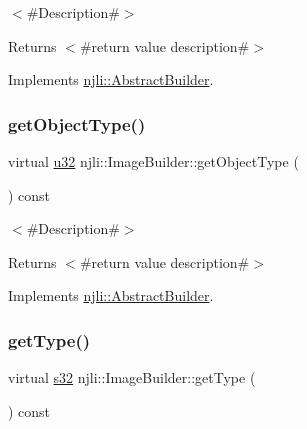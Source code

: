 $<$\#\+Description\#$>$

\begin{DoxyReturn}{Returns}
$<$\#return value description\#$>$ 
\end{DoxyReturn}


Implements \mbox{\hyperlink{classnjli_1_1_abstract_builder_a902f73ea78031b06aca183a417f3413b}{njli\+::\+Abstract\+Builder}}.

\mbox{\label{classnjli_1_1_image_builder_ae1c1fcb0cbeadd3b2436df14113e62d0}} 
\subsubsection{\texorpdfstring{get\+Object\+Type()}{getObjectType()}}
{\footnotesize\ttfamily virtual \mbox{\hyperlink{_util_8h_a10e94b422ef0c20dcdec20d31a1f5049}{u32}} njli\+::\+Image\+Builder\+::get\+Object\+Type (\begin{DoxyParamCaption}{ }\end{DoxyParamCaption}) const\hspace{0.3cm}{\ttfamily [virtual]}}

$<$\#\+Description\#$>$

\begin{DoxyReturn}{Returns}
$<$\#return value description\#$>$ 
\end{DoxyReturn}


Implements \mbox{\hyperlink{classnjli_1_1_abstract_builder_a0f2d344fcf697b167f4f2b1122b5fb33}{njli\+::\+Abstract\+Builder}}.

\mbox{\label{classnjli_1_1_image_builder_a93fa1a5be66fa2bd22accab9ee291e30}} 
\subsubsection{\texorpdfstring{get\+Type()}{getType()}}
{\footnotesize\ttfamily virtual \mbox{\hyperlink{_util_8h_aa62c75d314a0d1f37f79c4b73b2292e2}{s32}} njli\+::\+Image\+Builder\+::get\+Type (\begin{DoxyParamCaption}{ }\end{DoxyParamCaption}) const\hspace{0.3cm}{\ttfamily [virtual]}}

